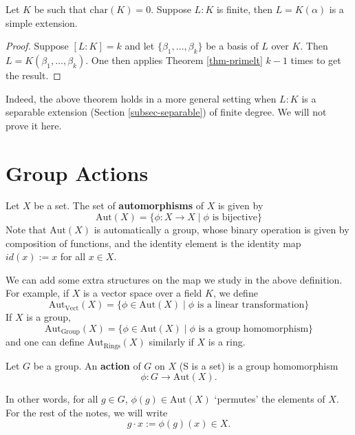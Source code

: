 \begin{corollary} \label{cor-primelt}
    Let $K$ be such that $\mathrm{char}(K) = 0$. Suppose $L:K$ is finite, then $L = K(\alpha)$ is a simple extension.
\end{corollary}
\begin{proof}
    Suppose $[L:K] = k$ and let $\{\beta_1, \dots, \beta_k\}$ be a basis of $L$ over $K$. Then $L = K(\beta_1, \dots, \beta_k)$. One then applies Theorem \ref{thm-primelt} $k-1$ times to get the result.
\end{proof}
Indeed, the above theorem holds in a more general setting when $L:K$ is a separable extension (Section \ref{subsec-separable}) of finite degree. We will not prove it here.

\section{Group Actions}
\begin{definition} Let $X$ be a set. The set of \textbf{automorphisms} of $X$ is given by
\[
\mathrm{Aut}(X) = \{\phi : X \to X \mid \phi \text{ is bijective}\}
\]
Note that $\mathrm{Aut}(X)$ is automatically a group, whose binary operation is given by composition of functions, and the identity element is the identity map $id(x) := x$ for all $x \in X$.
\end{definition}

We can add some extra structures on the map we study in the above definition. For example, if
$X$ is a vector space over a field $K$, we define
\[
\mathrm{Aut}_{\mathrm{Vect}}(X) = \{\phi \in \mathrm{Aut}(X) \mid \phi \text{ is a linear transformation}\}
\]
If $X$ is a group,
\[
\mathrm{Aut}_{\mathrm{Group}}(X) = \{\phi \in \mathrm{Aut}(X) \mid \phi \text{ is a group homomorphism}\}
\]
and one can define $\mathrm{Aut}_{\mathrm{Rings}}(X)$ similarly if $X$ is a ring.

\begin{definition} Let $G$ be a group. An \textbf{action} of $G$ on $X$ (S is a set) is a group homomorphism
\[
\phi : G \to \mathrm{Aut}(X).
\]
\end{definition}
In other words, for all $g \in G$, 
$\phi(g) \in \mathrm{Aut}(X)$ `permutes' the elements of $X$.
For the rest of the notes, we will write 
$$g \cdot x := \phi(g)(x) \in X.$$


